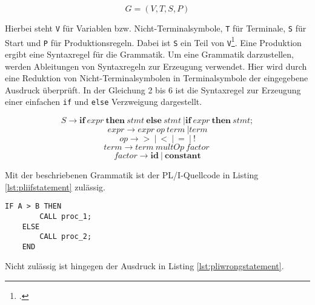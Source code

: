 \begin{center}
	\begin{equation}\label{eqn:grammar}
		G=(V,T,S,P)
	\end{equation}
\end{center}


Hierbei steht \verb+V+ für Variablen bzw. Nicht-Terminalsymbole, \verb+T+ für Terminale, \verb+S+ für Start und \verb+P+ für Produktionsregeln. Dabei ist \verb+S+ ein Teil von \verb+V+\footcite[Vgl.][S. 31ff.]{automata}. Eine Produktion ergibt eine Syntaxregel für die Grammatik. Um eine Grammatik darzustellen, werden Ableitungen von Syntaxregeln zur Erzeugung verwendet. Hier wird durch eine Reduktion von Nicht-Terminalsymbolen in Terminalsymbole der eingegebene Ausdruck überprüft. In der Gleichung 2 bis 6 ist die Syntaxregel zur Erzeugung einer einfachen \verb+if+ und \verb+else+ Verzweigung dargestellt.

\begin{center}
	\begin{equation}\label{eqn:start}
		S \to \mathbf{if}\: expr\: \mathbf{then}\: stmt\: \mathbf{else}\: stmt\: | \mathbf{if}\: expr\: \mathbf{then}\: stmt;
	\end{equation}
	\begin{equation}
		expr \to expr\: op\: term\: | term
	\end{equation}
	\begin{equation}
		op \to \mathbf{>}\: |\: \mathbf{<}\: |\: \mathbf{=}\: |\: \mathbf{!}
	\end{equation}
	\begin{equation}
		term \to term\: multOp\: factor\:
	\end{equation}
	\begin{equation}
		factor \to \mathbf{id}\: |\: \mathbf{constant}
	\end{equation}
\end{center}

\pagebreak
Mit der beschriebenen Grammatik ist der PL/I-Quellcode in Listing \ref{lst:pliifstatement} zulässig.

\begin{lstlisting}[language=PL/I, caption=PL/I-Verzweigung, label={lst:pliifstatement}]
	IF A > B THEN
		CALL proc_1;
	ELSE
		CALL proc_2;
	END
\end{lstlisting}

Nicht zulässig ist hingegen der Ausdruck in Listing \ref{lst:pliwrongstatement}.

